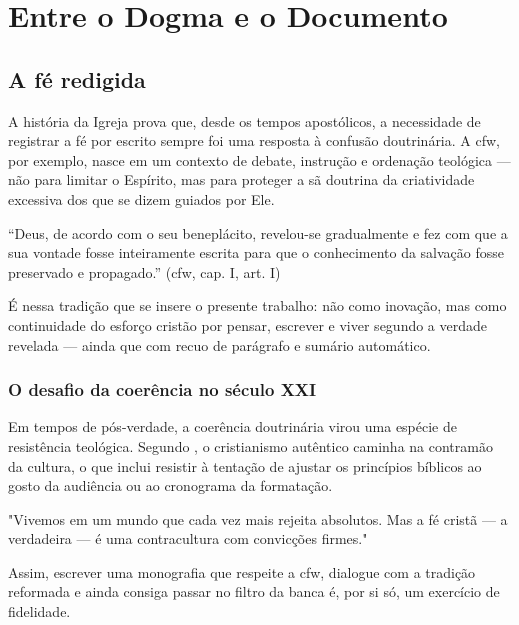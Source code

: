 \chapter{Entre o Dogma e o Documento}
\label{cap:dogmadocumento}

\section{A fé redigida}

A história da Igreja prova que, desde os tempos apostólicos, a necessidade de registrar a fé por escrito sempre foi uma resposta à confusão doutrinária. A \gls{cfw}, por exemplo, nasce em um contexto de debate, instrução e ordenação teológica — não para limitar o Espírito, mas para proteger a sã doutrina da criatividade excessiva dos que se dizem guiados por Ele.

\begin{citacao}
``Deus, de acordo com o seu beneplácito, revelou-se gradualmente e fez com que a sua vontade fosse inteiramente escrita para que o conhecimento da salvação fosse preservado e propagado.'' (\gls{cfw}, cap. I, art. I)
\end{citacao}

É nessa tradição que se insere o presente trabalho: não como inovação, mas como continuidade do esforço cristão por pensar, escrever e viver segundo a verdade revelada — ainda que com recuo de parágrafo e sumário automático.

\subsection{O desafio da coerência no século XXI}

Em tempos de pós-verdade, a coerência doutrinária virou uma espécie de resistência teológica. Segundo , o cristianismo autêntico caminha na contramão da cultura, o que inclui resistir à tentação de ajustar os princípios bíblicos ao gosto da audiência ou ao cronograma da formatação.

\begin{citacao}
"Vivemos em um mundo que cada vez mais rejeita absolutos. Mas a fé cristã — a verdadeira — é uma contracultura com convicções firmes." \cite{stottContracultura}
\end{citacao}

Assim, escrever uma monografia que respeite a \gls{cfw}, dialogue com a tradição reformada e ainda consiga passar no filtro da banca é, por si só, um exercício de fidelidade.

